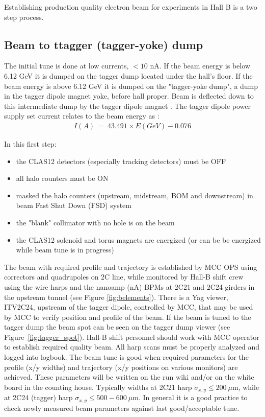 \indent

Establishing production quality electron beam for experiments in Hall B is a two step process. 

\subsection{Beam to ttagger (tagger-yoke) dump}
\indent

The initial tune is done at low currents, $<10$ nA. If the beam energy is below 6.12 GeV it is dumped on the tagger dump located under the hall's floor. If the beam energy is above 6.12 GeV  it is dumped on the "tagger-yoke dump", a dump in the tagger dipole magnet yoke, before hall proper. Beam is deflected down to this intermediate dump by the tagger dipole magnet \cite{tagger}. The tagger dipole power supply set current relates to the beam energy as \cite{yokedump}:
\begin{eqnarray}
I(A)~=~43.491\times E(GeV)-0.076
\end{eqnarray}


In this first step:
\begin{itemize}
\item the CLAS12 detectors (especially tracking detectors) must be OFF 
\item all halo counters must be ON
\item masked the halo counters (upstream, midstream, BOM and downstream) in beam Fast Shut Down (FSD) system 
\item the "blank" collimator with no hole is on the beam
\item the CLAS12 solenoid and torus magnets are energized (or can be be energized while beam tune is in progress)
\end{itemize}

The beam with required profile and trajectory is established by MCC OPS using correctors and quadrupoles on 2C line, while monitored by Hall-B shift crew using the wire harps and the nanoamp (nA) BPMs \cite{nA_BPM} at 2C21 and 2C24 girders in the upstream tunnel (see  Figure \ref{fig:belements}). There is a Yag viewer, ITV2C24, upstream of the tagger dipole, controlled by MCC, that may be used by MCC to verify position and profile of the beam. If the beam is tuned to the tagger dump the beam spot can be seen on the tagger dump viewer (see Figure~\ref{fig:tagger_spot}). 
Hall-B shift personnel should work with MCC operator to establish required quality beam. All harp scans must be properly analyzed and logged into logbook. The beam tune is good when required parameters for the profile (x/y widths) and trajectory (x/y positions on various monitors) are achieved. These parameters will be written on the run wiki and/or on the white board in the counting house. Typically widths at 2C21 harp $\sigma_{x,y}\le 200~\mu$m, while at 2C24 (tagger) harp $\sigma_{x,y}\le 500-600~\mu$m. In general it is a good practice to check newly measured beam parameters against last good/acceptable tune.  

